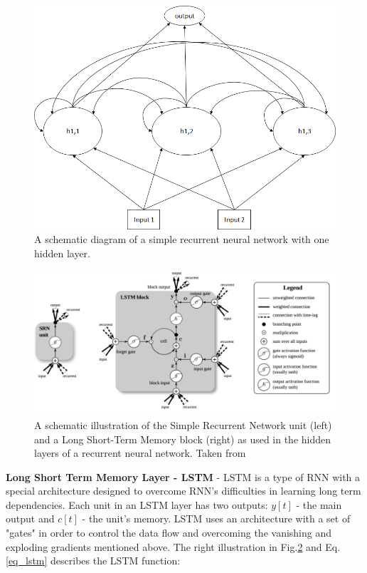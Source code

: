 \documentclass[
12pt, %
english, %
doublespacing, %
headsepline, %
]{MastersDoctoralThesis} %
\begin{document}
\begin{figure}
	\centering
	\includegraphics[width=0.7\linewidth]{Figures/RNN_Example}
	\caption{A schematic diagram of a simple recurrent neural network with one hidden layer.}
	\label{fig:RNN_Example}
\end{figure}

\begin{figure}
	\centering
	\includegraphics[width=1.0\linewidth]{LSTM_RNN_placeholder_clear.png}
	\caption{A schematic illustration of the Simple Recurrent Network unit (left) and a Long Short-Term Memory block (right) as used
		in the hidden layers of a recurrent neural network. Taken from \cite{ greff2017lstm}}	
	
	\label{fig:LSTM_arch}
\end{figure}
\textbf{Long Short Term Memory Layer - LSTM} - LSTM is a type of RNN with a special architecture designed to overcome RNN's difficulties in learning long term dependencies. Each unit in an LSTM layer has two outputs: $y[t]$ - the main output and $c[t]$ - the unit's memory. LSTM uses an architecture with a set of "gates" in order to control the data flow and overcoming the vanishing and exploding gradients mentioned above. The right illustration in Fig.\ref{fig:LSTM_arch} and Eq.\ref{eq_lstm} describes the LSTM function:
\end{document}
